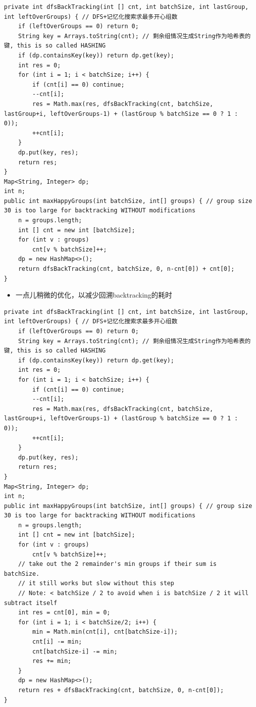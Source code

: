 \documentclass[9pt, b5paper]{article}
\begin{document}
\begin{verbatim}
private int dfsBackTracking(int [] cnt, int batchSize, int lastGroup, int leftOverGroups) { // DFS+记忆化搜索求最多开心组数
    if (leftOverGroups == 0) return 0;
    String key = Arrays.toString(cnt); // 剩余组情况生成String作为哈希表的键, this is so called HASHING
    if (dp.containsKey(key)) return dp.get(key);
    int res = 0;
    for (int i = 1; i < batchSize; i++) {
        if (cnt[i] == 0) continue;
        --cnt[i]; 
        res = Math.max(res, dfsBackTracking(cnt, batchSize, lastGroup+i, leftOverGroups-1) + (lastGroup % batchSize == 0 ? 1 : 0));
        ++cnt[i]; 
    }
    dp.put(key, res);
    return res;
}
Map<String, Integer> dp;
int n;
public int maxHappyGroups(int batchSize, int[] groups) { // group size 30 is too large for backtracking WITHOUT modifications
    n = groups.length;
    int [] cnt = new int [batchSize];
    for (int v : groups) 
        cnt[v % batchSize]++;
    dp = new HashMap<>();
    return dfsBackTracking(cnt, batchSize, 0, n-cnt[0]) + cnt[0];
}
\end{verbatim}
\begin{itemize}
\item 一点儿稍微的优化，以减少回溯backtracking的耗时
\end{itemize}
\begin{verbatim}
private int dfsBackTracking(int [] cnt, int batchSize, int lastGroup, int leftOverGroups) { // DFS+记忆化搜索求最多开心组数
    if (leftOverGroups == 0) return 0;
    String key = Arrays.toString(cnt); // 剩余组情况生成String作为哈希表的键, this is so called HASHING
    if (dp.containsKey(key)) return dp.get(key);
    int res = 0;
    for (int i = 1; i < batchSize; i++) {
        if (cnt[i] == 0) continue;
        --cnt[i]; 
        res = Math.max(res, dfsBackTracking(cnt, batchSize, lastGroup+i, leftOverGroups-1) + (lastGroup % batchSize == 0 ? 1 : 0));
        ++cnt[i]; 
    }
    dp.put(key, res);
    return res;
}
Map<String, Integer> dp;
int n;
public int maxHappyGroups(int batchSize, int[] groups) { // group size 30 is too large for backtracking WITHOUT modifications
    n = groups.length;
    int [] cnt = new int [batchSize];
    for (int v : groups) 
        cnt[v % batchSize]++;
    // take out the 2 remainder's min groups if their sum is batchSize.
    // it still works but slow without this step
    // Note: < batchSize / 2 to avoid when i is batchSize / 2 it will subtract itself
    int res = cnt[0], min = 0;
    for (int i = 1; i < batchSize/2; i++) {
        min = Math.min(cnt[i], cnt[batchSize-i]);
        cnt[i] -= min;
        cnt[batchSize-i] -= min;
        res += min;
    }
    dp = new HashMap<>();
    return res + dfsBackTracking(cnt, batchSize, 0, n-cnt[0]);
}
\end{verbatim}
\end{document}
